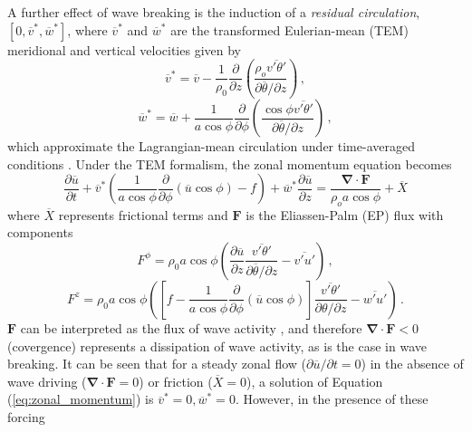 A further effect of wave breaking is the induction of a \emph{residual
  circulation}, $[0, \overline{v}^*, \overline{w}^*]$, where $\overline{v}^*$ and
$\overline{w}^*$ are the transformed Eulerian-mean (TEM) meridional and vertical
velocities given by
\begin{equation}
  \overline{v}^* = \overline{v} - \frac{1}{\rho_0}\frac{\partial}{\partial z}
  \left(\frac{\rho_o\overline{v'\theta'}}{\partial\overline{\theta}/{\partial z}}\right) \, , 
\end{equation}
\begin{equation}
\overline{w}^* = \overline{w} + \frac{1}{a\cos\phi}\frac{\partial}{\partial\phi}
\left(\frac{\cos\phi\overline{v'\theta'}}{\partial\overline{\theta}/{\partial
      z}}\right) \, ,
\end{equation}
which approximate the Lagrangian-mean circulation under time-averaged conditions
\citep{Andrews1976,Dunkerton1978,Holton1980a}. Under the TEM formalism, the zonal
momentum equation becomes
\begin{equation}
\frac{\partial\overline{u}}{\partial t} +
\overline{v}^*\left(\frac{1}{a\cos\phi}\frac{\partial}{\partial\phi}(\overline{u}\cos{\phi})
  - f \right) + \overline{w}^*\frac{\partial\overline{u}}{\partial z} =
\frac{\mathbf{\nabla \cdot F}}{\rho_oa\cos\phi} + \overline{X}
\label{eq:zonal_momentum}
\end{equation}
where $\overline{X}$ represents frictional terms and $\mathbf{F}$ is the
Eliassen-Palm (EP) flux with components
\begin{equation}
F^\phi = \rho_0a\cos\phi\left(\frac{\partial\overline{u}}{\partial
    z}\frac{\overline{v'\theta'}}{\partial\overline{\theta}/\partial z} -
  \overline{v'u'}\right) \, ,
\end{equation}
\begin{equation}
F^z =
\rho_0a\cos\phi\left(\left[f-\frac{1}{a\cos\phi}\frac{\partial}{\partial\phi}(\overline{u}\cos\phi)\right]\frac{\overline{v'\theta'}}{\partial\theta/\partial
      z} - \overline{w'u'}\right) \, .
\end{equation}
$\mathbf{F}$ can be interpreted as the flux of wave activity
\citep{Andrews1987}, and therefore $\mathbf{\nabla\cdot F}<0$ (covergence)
represents a dissipation of wave activity, as is the case in wave breaking. It
can be seen that for a steady zonal flow ($\partial\overline{u}/\partial t = 0$)
in the absence of wave driving ($\mathbf{\nabla\cdot F} = 0$) or friction
($\overline{X} = 0$), a solution of Equation (\ref{eq:zonal_momentum}) is
$\overline{v}^*=0, \overline{w}^*=0$.  However, in the presence of these forcing
